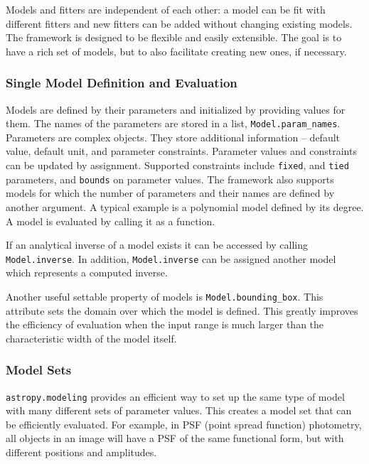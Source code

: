 \documentclass[modern]{aastex61}
\newcommand{\package}[1]{\texttt{#1}\xspace}
\begin{document}
Models and fitters are independent of each other: a model can be fit with different
fitters and new fitters can be added without changing existing models. The
framework is designed to be flexible and easily extensible. The goal is to have
a rich set of models, but to also facilitate creating new ones, if necessary.

\subsubsection{Single Model Definition and Evaluation}

Models are defined by their parameters and initialized by providing values for them. The
names of the parameters are stored in a list, \texttt{Model.param\_names}. Parameters are complex objects.
They store additional information -- default value, default unit, and parameter constraints. Parameter
values and constraints can be updated by assignment. Supported constraints include \texttt{fixed},
and \texttt{tied} parameters, and \texttt{bounds} on parameter values. The framework also supports models
for which the number of parameters and their names are defined by another argument.
A typical example is a polynomial model defined by its degree.
A model is evaluated by calling it as a function.

If an analytical inverse of a model exists it can be
accessed  by calling \texttt{Model.inverse}. In addition, \texttt{Model.inverse} can be assigned
another model which represents a computed inverse.

Another useful settable property of models is \texttt{Model.bounding\_box}. This attribute sets the domain over which the model is defined. This greatly improves the efficiency of evaluation when the input range is much larger than the characteristic width of the model itself.

\subsubsection{Model Sets}

\package{astropy.modeling} provides an efficient way to set up the same type of model with many different sets of parameter values.
This creates a model set that can be efficiently evaluated. For example, in PSF (point spread function) photometry, all objects in an image will have a PSF of the same functional form, but with different positions and amplitudes.
\end{document}
